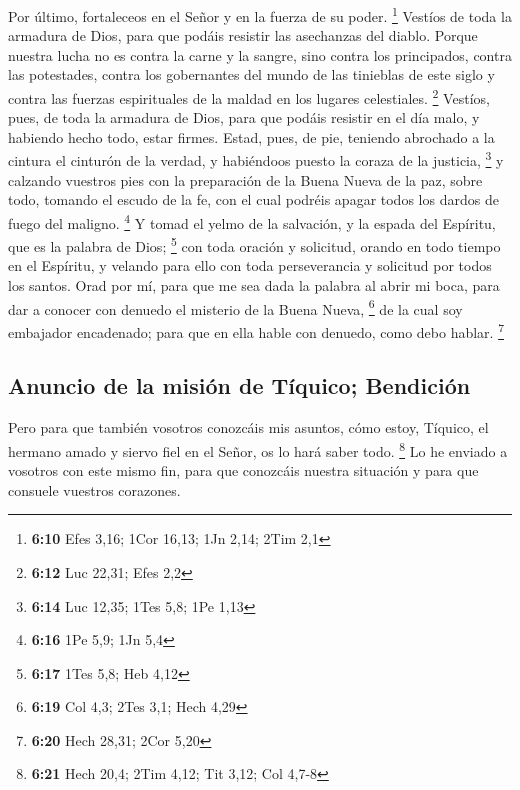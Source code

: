 \begin{paracol}{2}
 Por último, fortaleceos en el Señor y en la fuerza de su
poder. \footnote{\textbf{6:10} Efes 3,16; 1Cor 16,13; 1Jn 2,14; 2Tim 2,1}
 Vestíos de toda la armadura de Dios, para que podáis
resistir las asechanzas del diablo.  Porque nuestra lucha
no es contra la carne y la sangre, sino contra los principados, contra
las potestades, contra los gobernantes del mundo de las tinieblas de
este siglo y contra las fuerzas espirituales de la maldad en los lugares
celestiales. \footnote{\textbf{6:12} Luc 22,31; Efes 2,2}
 Vestíos, pues, de toda la armadura de Dios, para que
podáis resistir en el día malo, y habiendo hecho todo, estar firmes.
 Estad, pues, de pie, teniendo abrochado a la cintura el
cinturón de la verdad, y habiéndoos puesto la coraza de la justicia,
\footnote{\textbf{6:14} Luc 12,35; 1Tes 5,8; 1Pe 1,13}  y
calzando vuestros pies con la preparación de la Buena Nueva de la paz,
 sobre todo, tomando el escudo de la fe, con el cual
podréis apagar todos los dardos de fuego del maligno. \footnote{\textbf{6:16}
  1Pe 5,9; 1Jn 5,4}  Y tomad el yelmo de la salvación, y
la espada del Espíritu, que es la palabra de Dios; \footnote{\textbf{6:17}
  1Tes 5,8; Heb 4,12}  con toda oración y solicitud,
orando en todo tiempo en el Espíritu, y velando para ello con toda
perseverancia y solicitud por todos los santos.  Orad por
mí, para que me sea dada la palabra al abrir mi boca, para dar a conocer
con denuedo el misterio de la Buena Nueva, \footnote{\textbf{6:19} Col
  4,3; 2Tes 3,1; Hech 4,29}  de la cual soy embajador
encadenado; para que en ella hable con denuedo, como debo hablar.
\footnote{\textbf{6:20} Hech 28,31; 2Cor 5,20}

\hypertarget{anuncio-de-la-misiuxf3n-de-tuxedquico-bendiciuxf3n}{%
\subsection{Anuncio de la misión de Tíquico;
Bendición}\label{anuncio-de-la-misiuxf3n-de-tuxedquico-bendiciuxf3n}}

 Pero para que también vosotros conozcáis mis asuntos,
cómo estoy, Tíquico, el hermano amado y siervo fiel en el Señor, os lo
hará saber todo. \footnote{\textbf{6:21} Hech 20,4; 2Tim 4,12; Tit 3,12;
  Col 4,7-8}  Lo he enviado a vosotros con este mismo
fin, para que conozcáis nuestra situación y para que consuele vuestros
corazones.


\end{paracol}
